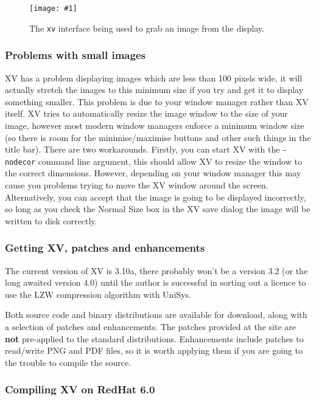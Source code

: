 \documentclass[twoside,11pt]{article}
\newcommand{\htmladdnormallink}[2]{#1}
\newcommand{\htmladdimg}[1]{}
\newcommand{\htmlref}[2]{#1}
\newcommand{\myfig} [5] {
  \begin{figure}
    \centering\texttt{[image: \#1]}
    \typeout{#1 inserted on page \arabic{page}}
    \caption{\label{#4}#5}
  \end{figure}
  }
\newcommand{\myfig}[5]{
    \label{#4} \htmladdimg{#3}\\
    Figure: #5\\
    }
\begin{document}
\myfig{sc15_xv_capture.eps}{height=0.4\textheight}{sc15_xv_capture.gif}{sc15_xv_capture}{The {\tt xv} interface being used to grab an image from the display.}

\subsubsection{Problems with small images}

XV has a problem displaying images which are less than 100 pixels wide, it will actually stretch the images to this minimum size if you try and get it to display something smaller. This problem is due to your window manager rather than XV itself. XV tries to automatically resize the image window to the size of your image, however most modern window managers enforce a minimum window size (so there is room for the minimise/maximise buttons and other such things in the title bar). There are two workarounds. Firstly, you can start XV with the {\tt -nodecor} command line argument, this should allow XV to resize the window to the correct dimensions. However, depending on your window manager this may cause you problems trying to move the XV window around the screen. Alternatively, you can accept that the image is going to be displayed incorrectly, so long as you check the {\sc Normal Size} box in the XV save dialog the image will be written to disk correctly.

\subsubsection{Getting XV, patches and enhancements}

The current version of XV is 3.10a, there probably won't be a version 3.2 (or the long awaited version 4.0) until the author is successful in sorting out a \htmlref{licence}{sc15_giflegal} to use the LZW compression algorithm with UniSys.

Both source code and binary distributions are available for \htmladdnormallink{download}{http://www.trilon.com/xv/downloads.html}, along with a selection of patches and enhancements. The patches provided at the site are {\bf not} pre-applied to the standard distributions. Enhancements include patches to read/write PNG and PDF files, so it is worth applying them if you are going to the trouble to compile the source.

\subsubsection{Compiling XV on RedHat 6.0}
\end{document}
